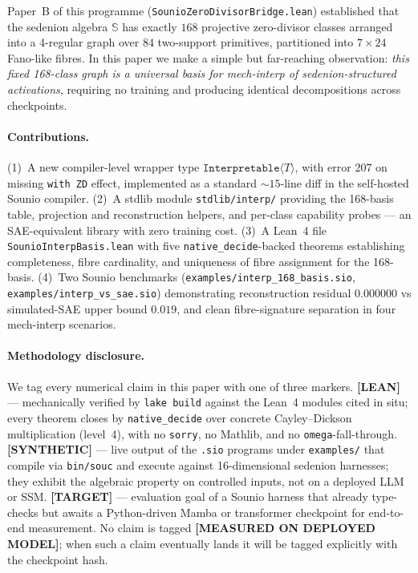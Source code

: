 \documentclass{article}
\newcommand{\sio}{\mathbb{S}}
\newcommand{\Interpretable}[1]{\texttt{Interpretable}\langle #1 \rangle}
\newcommand{\withZD}{\texttt{with ZD}}
\begin{document}
Paper~B of this programme (\texttt{SounioZeroDivisorBridge.lean})
established that the sedenion algebra $\sio$ has exactly $168$
projective zero-divisor classes arranged into a 4-regular graph over
$84$ two-support primitives, partitioned into $7 \times 24$ Fano-like
fibres.  In this paper we make a simple but far-reaching observation:
\emph{this fixed 168-class graph is a universal basis for mech-interp
of sedenion-structured activations}, requiring no training and
producing identical decompositions across checkpoints.

\paragraph{Contributions.}
(1)~A new compiler-level wrapper type $\Interpretable{T}$, with error
207 on missing \withZD{} effect, implemented as a standard
$\sim 15$-line diff in the self-hosted Sounio compiler.
(2)~A stdlib module \texttt{stdlib/interp/} providing the 168-basis
table, projection and reconstruction helpers, and per-class capability
probes --- an SAE-equivalent library with zero training cost.
(3)~A Lean~4 file \texttt{SounioInterpBasis.lean} with five
\texttt{native\_decide}-backed theorems establishing completeness,
fibre cardinality, and uniqueness of fibre assignment for the
168-basis.
(4)~Two Sounio benchmarks (\texttt{examples/interp\_168\_basis.sio},
\texttt{examples/interp\_vs\_sae.sio}) demonstrating reconstruction
residual $0.000000$ vs simulated-SAE upper bound $0.019$, and
clean fibre-signature separation in four mech-interp scenarios.

\paragraph{Methodology disclosure.}
We tag every numerical claim in this paper with one of three markers.
\textbf{[LEAN]} --- mechanically verified by \texttt{lake build} against
the Lean~4 modules cited in situ; every theorem closes by
\texttt{native\_decide} over concrete Cayley--Dickson multiplication
(level~4), with no \texttt{sorry}, no Mathlib, and no \texttt{omega}-fall-through.
\textbf{[SYNTHETIC]} --- live output of the \texttt{.sio} programs under
\texttt{examples/} that compile via \texttt{bin/souc} and execute against
16-dimensional sedenion harnesses; they exhibit the algebraic property on
controlled inputs, not on a deployed LLM or SSM.
\textbf{[TARGET]} --- evaluation goal of a Sounio harness that already
type-checks but awaits a Python-driven Mamba or transformer checkpoint
for end-to-end measurement.
No claim is tagged \textbf{[MEASURED ON DEPLOYED MODEL]}; when such a claim
eventually lands it will be tagged explicitly with the checkpoint hash.
\end{document}

